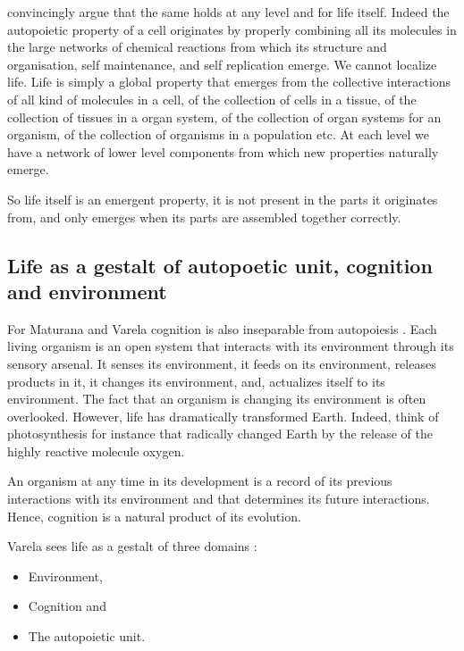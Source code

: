 \documentclass[
  11pt,
]{book}
\providecommand{\tightlist}{%
  \setlength{\itemsep}{0pt}\setlength{\parskip}{0pt}}
\begin{document}
\citet{capraLuisi2014} convincingly argue that the same holds at any level and for life itself. Indeed the autopoietic property of a cell originates by properly combining all its molecules in the large networks of chemical reactions from which its structure and organisation, self maintenance, and self replication emerge. We cannot localize life. Life is simply a global property that emerges from the collective interactions of all kind of molecules in a cell, of the collection of cells in a tissue, of the collection of tissues in a organ system, of the collection of organ systems for an organism, of the collection of organisms in a population etc.
At each level we have a network of lower level components from which new properties naturally emerge.

So life itself is an emergent property, it is not present in the parts it originates from, and only emerges when its parts are assembled together correctly.

\hypertarget{life-as-a-gestalt-of-autopoetic-unit-cognition-and-environment}{%
\subsection{Life as a gestalt of autopoetic unit, cognition and environment}\label{life-as-a-gestalt-of-autopoetic-unit-cognition-and-environment}}

For Maturana and Varela cognition is also inseparable from autopoiesis \citep{capraLuisi2014}. Each living organism is an open system that interacts with its environment through its sensory arsenal. It senses its environment, it feeds on its environment, releases products in it, it changes its environment, and, actualizes itself to its environment. The fact that an organism is changing its environment is often overlooked. However, life has dramatically transformed Earth. Indeed, think of photosynthesis for instance that radically changed Earth by the release of the highly reactive molecule oxygen.

An organism at any time in its development is a record of its previous interactions with its environment and that determines its future interactions.
Hence, cognition is a natural product of its evolution.

Varela sees life as a gestalt of three domains \citep{capraLuisi2014}:

\begin{itemize}
\tightlist
\item
  Environment,
\item
  Cognition and
\item
  The autopoietic unit.
\end{itemize}
\end{document}
